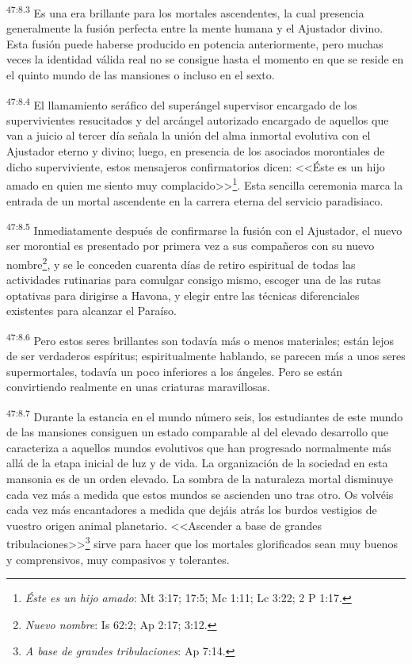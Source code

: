 \par
\textsuperscript{47:8.3} Es una era brillante para los mortales ascendentes, la cual presencia generalmente la fusión perfecta entre la mente humana y el Ajustador divino. Esta fusión puede haberse producido en potencia anteriormente, pero muchas veces la identidad válida real no se consigue hasta el momento en que se reside en el quinto mundo de las mansiones o incluso en el sexto.

\par
\textsuperscript{47:8.4} El llamamiento seráfico del superángel supervisor encargado de los supervivientes resucitados y del arcángel autorizado encargado de aquellos que van a juicio al tercer día señala la unión del alma inmortal evolutiva con el Ajustador eterno y divino; luego, en presencia de los asociados morontiales de dicho superviviente, estos mensajeros confirmatorios dicen: <<Éste es un hijo amado en quien me siento muy complacido>>\footnote{\textit{Éste es un hijo amado}: Mt 3:17; 17:5; Mc 1:11; Lc 3:22; 2 P 1:17.}. Esta sencilla ceremonia marca la entrada de un mortal ascendente en la carrera eterna del servicio paradisiaco.

\par
\textsuperscript{47:8.5} Inmediatamente después de confirmarse la fusión con el Ajustador, el nuevo ser morontial es presentado por primera vez a sus compañeros con su nuevo nombre\footnote{\textit{Nuevo nombre}: Is 62:2; Ap 2:17; 3:12.}, y se le conceden cuarenta días de retiro espiritual de todas las actividades rutinarias para comulgar consigo mismo, escoger una de las rutas optativas para dirigirse a Havona, y elegir entre las técnicas diferenciales existentes para alcanzar el Paraíso.

\par
\textsuperscript{47:8.6} Pero estos seres brillantes son todavía más o menos materiales; están lejos de ser verdaderos espíritus; espiritualmente hablando, se parecen más a unos seres supermortales, todavía un poco inferiores a los ángeles. Pero se están convirtiendo realmente en unas criaturas maravillosas.

\par
\textsuperscript{47:8.7} Durante la estancia en el mundo número seis, los estudiantes de este mundo de las mansiones consiguen un estado comparable al del elevado desarrollo que caracteriza a aquellos mundos evolutivos que han progresado normalmente más allá de la etapa inicial de luz y de vida. La organización de la sociedad en esta mansonia es de un orden elevado. La sombra de la naturaleza mortal disminuye cada vez más a medida que estos mundos se ascienden uno tras otro. Os volvéis cada vez más encantadores a medida que dejáis atrás los burdos vestigios de vuestro origen animal planetario. <<Ascender a base de grandes tribulaciones>>\footnote{\textit{A base de grandes tribulaciones}: Ap 7:14.} sirve para hacer que los mortales glorificados sean muy buenos y comprensivos, muy compasivos y tolerantes.

